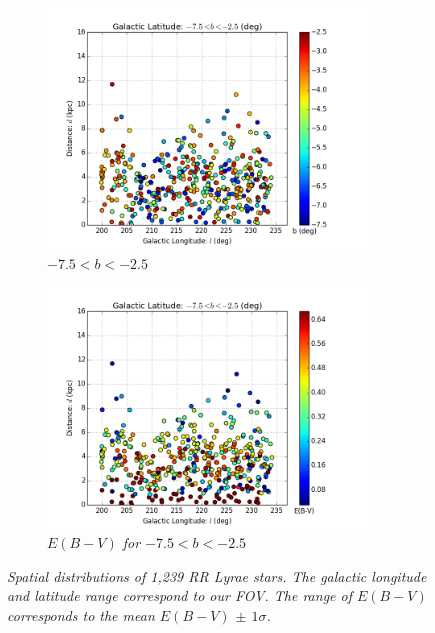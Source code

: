 \documentclass[aps,prb,twocolumn,superscriptaddress]{revtex4-1}
\begin{document}
\begin{figure}
	\begin{subfigure}{.5\textwidth}
	  \centering
			\includegraphics[width=3.35in]{figures/PlotsSpace15/dist_b_ln_limit15.png}
		\caption{\it \small{$-7.5 < b < -2.5$ }}
		\label{fig:bln}
	\end{subfigure}%
	\begin{subfigure}{.5\textwidth}
	  \centering
			\includegraphics[width=3.35in]{figures/PlotsSpace15/dist_EBV_ln_limit15.png}
		\caption{\it \small{$E(B-V)$ for $-7.5 < b < -2.5$ }}
		\label{fig:EBVln}
	\end{subfigure}%
	\caption{\it \small{Spatial distributions of 1,239 RR Lyrae stars. The galactic longitude and latitude range correspond to our FOV. The range of $E(B-V)$ corresponds to the mean $E(B-V)$ $\pm$ $1\sigma$.}}
	\label{fig:RRspace}
\end{figure}
\end{document}
